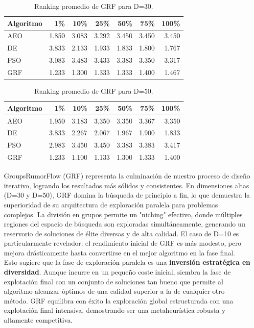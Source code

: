 \documentclass[11pt,a4paper]{article}
\begin{document}
\begin{table}[h!]
\centering \caption{Ranking promedio de GRF para D=30.} \label{tab:grf_d30}
\begin{tabular}{lrrrrrr} \toprule Algoritmo & 1\% & 10\% & 25\% & 50\% & 75\% & 100\% \\ \midrule 
AEO & 1.850 & 3.083 & 3.292 & 3.450 & 3.450 & 3.450 \\
DE  & 3.833 & 2.133 & 1.933 & 1.833 & 1.800 & 1.767 \\
PSO & 3.083 & 3.483 & 3.433 & 3.383 & 3.350 & 3.317 \\
GRF & 1.233 & 1.300 & 1.333 & 1.333 & 1.400 & 1.467 \\
\bottomrule \end{tabular} \end{table}

\begin{table}[h!]
\centering \caption{Ranking promedio de GRF para D=50.} \label{tab:grf_d50}
\begin{tabular}{lrrrrrr} \toprule Algoritmo & 1\% & 10\% & 25\% & 50\% & 75\% & 100\% \\ \midrule 
AEO & 1.950 & 3.183 & 3.350 & 3.350 & 3.367 & 3.350 \\
DE  & 3.833 & 2.267 & 2.067 & 1.967 & 1.900 & 1.833 \\
PSO & 2.983 & 3.450 & 3.450 & 3.383 & 3.383 & 3.417 \\
GRF & 1.233 & 1.100 & 1.133 & 1.300 & 1.333 & 1.400 \\
\bottomrule \end{tabular} \end{table}

GroupsRumorFlow (GRF) representa la culminación de nuestro proceso de diseño iterativo, logrando los resultados más sólidos y consistentes. En dimensiones altas (D=30 y D=50), GRF domina la búsqueda de principio a fin, lo que demuestra la superioridad de su arquitectura de exploración paralela para problemas complejos. La división en grupos permite un "niching" efectivo, donde múltiples regiones del espacio de búsqueda son exploradas simultáneamente, generando un reservorio de soluciones de élite diversas y de alta calidad. El caso de D=10 es particularmente revelador: el rendimiento inicial de GRF es más modesto, pero mejora drásticamente hasta convertirse en el mejor algoritmo en la fase final. Esto sugiere que la fase de exploración paralela es una \textbf{inversión estratégica en diversidad}. Aunque incurre en un pequeño coste inicial, siembra la fase de explotación final con un conjunto de soluciones tan bueno que permite al algoritmo alcanzar óptimos de una calidad superior a la de cualquier otro método. GRF equilibra con éxito la exploración global estructurada con una explotación final intensiva, demostrando ser una metaheurística robusta y altamente competitiva.
\newpage
\end{document}
